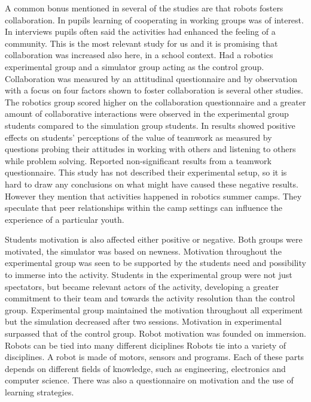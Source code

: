 A common bonus mentioned in several of the studies are that robots fosters collaboration. In \cite{lindh2007does} pupils learning of cooperating in working groups was of interest. In interviews pupils often said the activities had enhanced the feeling of a community. This is the most relevant study for us and it is promising that collaboration was increased also here, in a school context. \cite{mitnik2009collaborative} Had a robotics experimental group and a simulator group acting as the control group. Collaboration was measured by an attitudinal questionnaire and by observation with a focus on four factors shown to foster collaboration is several other studies. The robotics group scored higher on the collaboration questionnaire and a greater amount of collaborative interactions were observed in the experimental group students compared to the simulation group students. In \cite{nugent2008effect} results showed positive effects on students’ perceptions of the value of teamwork as measured by questions probing their attitudes in working with others and listening to others while problem solving. \cite{nugent2009use} Reported non-significant results from a teamwork questionnaire. This study has not described their experimental setup, so it is hard to draw any conclusions on what might have caused these negative results. However they mention that activities happened in robotics summer camps. They speculate that peer relationships within the camp settings can influence the experience of a particular youth.

\bigskip\noindent
Students motivation is also affected either positive or negative.
\cite{mitnik2009collaborative} Both groups were motivated, the simulator was based on newness. Motivation throughout the experimental group was seen to be supported by the students need and possibility to immerse into the activity. Students in the experimental group were not just spectators, but became relevant actors of the activity, developing a greater commitment to their team and towards the activity resolution than the control group. Experimental group maintained the motivation throughout all experiment but the simulation decreased after two sessions. 
\cite{mitnik2009collaborative}Motivation in experimental surpassed that of the control group. Robot motivation was founded on immersion.
Robots can be tied into many different diciplines
\cite{barker2007robotics} Robots tie into a variety of disciplines. A robot is made of motors, sensors and programs. Each of these parts depends on different fields of knowledge, such as engineering, electronics and computer science. 
\cite{nugent2008effect} There was also a questionnaire on motivation and the use of learning strategies.

